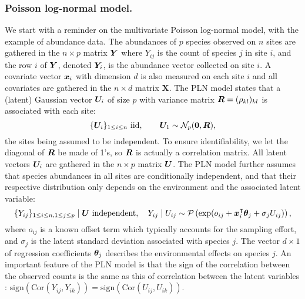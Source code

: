 \subsubsection*{Poisson log-normal model.} 
We start with a reminder on the multivariate Poisson log-normal model, with the example of abundance data. The abundances of $p$ species observed on $n$ sites are gathered in the $n \times p$ matrix ${\boldsymbol{Y}}$ where $Y_ {ij}$ is the count of species $j$ in site $i$, and the row $i$ of ${\boldsymbol{Y}}$, denoted ${\boldsymbol{Y}}_i$, is the abundance vector collected on site $i$. A covariate vector ${\boldsymbol{x}}_i $ with dimension $d$ is also measured on each site $i$ and all covariates are gathered in the $n \times d$ matrix  $\boldsymbol X$. The PLN model states that a (latent) Gaussian vector ${\boldsymbol{U}}_i$ of size $p$ with variance matrix ${\boldsymbol{R}} = (\rho_{kl})_{kl}$ is associated with each site:
\begin{equation} \label{eq:PLN-Z}
\{{\boldsymbol{U}}_i\}_{1 \leq i \leq n} \text{ iid}, \qquad 
{\boldsymbol{U}}_1 \sim {\mathcal{N}}_p({\boldsymbol{0}}, {\boldsymbol{R}}),
\end{equation}
the sites being assumed to be independent. To ensure identifiability, we let the diagonal of ${\boldsymbol{R}}$ be made of 1's, so ${\boldsymbol{R}}$ is actually a correlation matrix.
All latent vectors ${\boldsymbol{U}}_i$ are gathered in the $n \times p$ matrix ${\boldsymbol{U}}$. The PLN model further assumes that species abundances in all sites are conditionally independent, and that their respective distribution only depends on the environment and the associated latent variable:
\begin{equation} \label{eq:PLN-Y.Z}
\{Y_{ij}\}_{1 \leq i \leq n, 1 \leq j \leq p} \mid {\boldsymbol{U}} \text{ independent}, \quad 
Y_{ij} \mid U_{ij} \sim {\mathcal{P}}\left(\exp(o_{ij} + {\boldsymbol{x}}_i^\intercal {\boldsymbol{\theta}}_j + \sigma_j U_{ij})\right),
\end{equation}
where $o_{ij}$ is a known offset term which typically accounts for the sampling effort, and $\sigma_j$ is the latent standard deviation associated with species $j$. The vector $d \times 1$ of regression coefficients ${\boldsymbol{\theta}}_j$ describes the environmental effects on species $j$. An important feature of the PLN model is that the sign of the correlation between the observed counts is the same as this of correlation between the latent variables \citep{AiH89}: $\text{sign}(\text{Cor}(Y_{ij}, Y_{ik})) = \text{sign}(\text{Cor}(U_{ij}, U_{ik}))$. 

